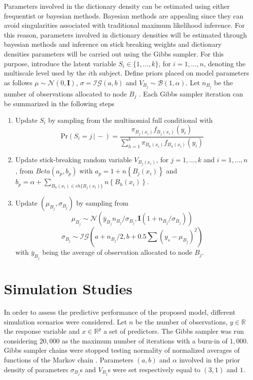 \documentclass{article}
\newcommand{\Real}{\mathbb{R}}
\providecommand{\mb}[1]{\boldsymbol{#1}}
\providecommand{\mc}[1]{\mathcal{#1}}
\begin{document}
Parameters involved in the dictionary density can be estimated using either frequentist or bayesian methods. Bayesian methods are appealing since they can avoid singularities associated with traditional maximum likelihood inference. For this reason, parameters involved in dictionary densities will be estimated through bayesian methods and inference on stick breaking weights and dictionary densities parameters will be carried out using the Gibbs sampler. For this purpose, introduce the latent variable $S_i \in \{1,\ldots,k\}$, for $i=1,\ldots,n$, denoting the multiscale level used by the $i$th subject. Define priors placed on model parameters as follows $\mu \sim \mc{N}(0,\mb{I})$, $\sigma=\mc{IG}(a,b)$ and $V_{B_j} \sim \mc{B}(1,\alpha)$. Let $n_{B_j}$ be  the number of observations allocated to node $B_j$ . Each Gibbs sampler iteration can be summarized in the following steps
\begin{enumerate}
\item Update $S_i$ by sampling from the multinomial full conditional with 
\[\mbox{Pr}( S_i = j\, |\, -) = \frac{ \pi_{B_j(x_i)}f_{B_j(x_i)}(y_i) }{ \sum_{h=1}^k \pi_{B_h(x_i)}f_{B_h(x_i)}(y_i) } \label{eq:prS}\]
\item Update stick-breaking random variable $V_{B_j(x_i)}$, for $j=1, \ldots, k$ and $i=1, \ldots, n$, from $Beta(a_p,b_p)$ with $a_p=1+n\left\{B_j(x_i)\right\}$ and $b_p=\alpha+\sum_{B_h(x_i) \in ch\{B_j(x_i)\}} n\left\{B_h(x_i)\right\}$.
\item Update $(\mu_{B_j},\sigma_{B_j})$ by sampling from
\[  \mu_{B_j} \sim \mc{N}\left(\bar{y}_{B_j} n_{B_j}/\sigma_{B_j},\mb{I}(1+n_{B_j}/\sigma_{B_j})\right)\]
\[  \sigma_{B_j} \sim \mc{IG}\left(a+n_{B_j}/2,b+0.5\sum \left(y_{s}-\mu_{B_j}\right)^2\right)\]
with $\bar{y}_{B_j}$ being the average of observation allocated to node $B_j$.

\end{enumerate}



\section{Simulation Studies}
In order to assess the predictive performance of the proposed model, different simulation scenarios were considered. Let $n$ be the number of observations, $y \in \Real$ the response variable and $x \in \Real^p$ a set of predictors. The Gibbs sampler was run considering $20,000$ as the maximum number of iterations with a burn-in of $1,000$. Gibbs sampler chains were stopped testing normality of normalized averages of functions of the Markov chain \cite{Chauveau98anautomated}. Parameters $(a,b)$ and $\alpha$ involved in the prior density of parameters $\sigma_{B_j}$s and $V_{B_j}$s were set respectively equal to $(3,1)$ and $1$.
\end{document}
